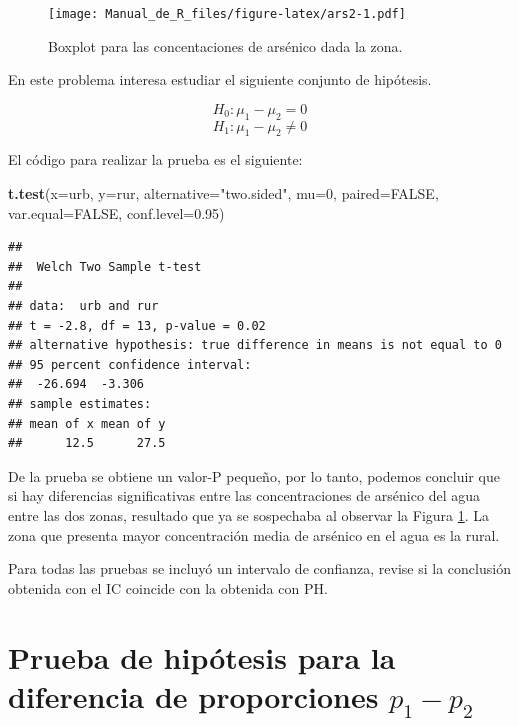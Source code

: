 \documentclass[10pt,]{krantz}
\makeatletter
\newenvironment{Shaded}{\begin{snugshade}}{\end{snugshade}}
\newcommand{\KeywordTok}[1]{\textcolor[rgb]{0.13,0.29,0.53}{\textbf{#1}}}
\newcommand{\DataTypeTok}[1]{\textcolor[rgb]{0.13,0.29,0.53}{#1}}
\newcommand{\DecValTok}[1]{\textcolor[rgb]{0.00,0.00,0.81}{#1}}
\newcommand{\FloatTok}[1]{\textcolor[rgb]{0.00,0.00,0.81}{#1}}
\newcommand{\StringTok}[1]{\textcolor[rgb]{0.31,0.60,0.02}{#1}}
\newcommand{\OtherTok}[1]{\textcolor[rgb]{0.56,0.35,0.01}{#1}}
\newcommand{\NormalTok}[1]{#1}
\newenvironment{kframe}{%
\medskip{}
\setlength{\fboxsep}{.8em}
 \def\at@end@of@kframe{}%
 \ifinner\ifhmode%
  \def\at@end@of@kframe{\end{minipage}}%
  \begin{minipage}{\columnwidth}%
 \fi\fi%
 \def\FrameCommand##1{\hskip\@totalleftmargin \hskip-\fboxsep
 \colorbox{shadecolor}{##1}\hskip-\fboxsep
     \hskip-\linewidth \hskip-\@totalleftmargin \hskip\columnwidth}%
 \MakeFramed {\advance\hsize-\width
   \@totalleftmargin\z@ \linewidth\hsize
   \@setminipage}}%
 {\par\unskip\endMakeFramed%
 \at@end@of@kframe}
\renewenvironment{Shaded}{\begin{kframe}}{\end{kframe}}
\let\BeginKnitrBlock\begin \let\EndKnitrBlock\end
\makeatother
\begin{document}
\begin{figure}
\centering
\texttt{[image: Manual\_de\_R\_files/figure-latex/ars2-1.pdf]}
\caption{\label{fig:ars2}Boxplot para las concentaciones de arsénico dada la
zona.}
\end{figure}

En este problema interesa estudiar el siguiente conjunto de hipótesis.

\[H_0: \mu_1  - \mu_2 = 0\] \[H_1: \mu_1  - \mu_2 \neq 0\]

El código para realizar la prueba es el siguiente:

\begin{Shaded}
\begin{Highlighting}[]
\KeywordTok{t.test}\NormalTok{(}\DataTypeTok{x=}\NormalTok{urb, }\DataTypeTok{y=}\NormalTok{rur, }\DataTypeTok{alternative=}\StringTok{"two.sided"}\NormalTok{, }\DataTypeTok{mu=}\DecValTok{0}\NormalTok{, }
       \DataTypeTok{paired=}\OtherTok{FALSE}\NormalTok{, }\DataTypeTok{var.equal=}\OtherTok{FALSE}\NormalTok{, }\DataTypeTok{conf.level=}\FloatTok{0.95}\NormalTok{)}
\end{Highlighting}
\end{Shaded}

\begin{verbatim}
## 
##  Welch Two Sample t-test
## 
## data:  urb and rur
## t = -2.8, df = 13, p-value = 0.02
## alternative hypothesis: true difference in means is not equal to 0
## 95 percent confidence interval:
##  -26.694  -3.306
## sample estimates:
## mean of x mean of y 
##      12.5      27.5
\end{verbatim}

De la prueba se obtiene un valor-P pequeño, por lo tanto, podemos
concluir que si hay diferencias significativas entre las concentraciones
de arsénico del agua entre las dos zonas, resultado que ya se sospechaba
al observar la Figura \ref{fig:ars2}. La zona que presenta mayor
concentración media de arsénico en el agua es la rural.

\BeginKnitrBlock{rmdtip}
Para todas las pruebas se incluyó un intervalo de confianza, revise si
la conclusión obtenida con el IC coincide con la obtenida con PH.
\EndKnitrBlock{rmdtip}

\section{\texorpdfstring{Prueba de hipótesis para la diferencia de
proporciones
\(p_1 - p_2\)}{Prueba de hipótesis para la diferencia de proporciones p\_1 - p\_2}}\label{prueba-de-hipotesis-para-la-diferencia-de-proporciones-p_1---p_2}
\end{document}
